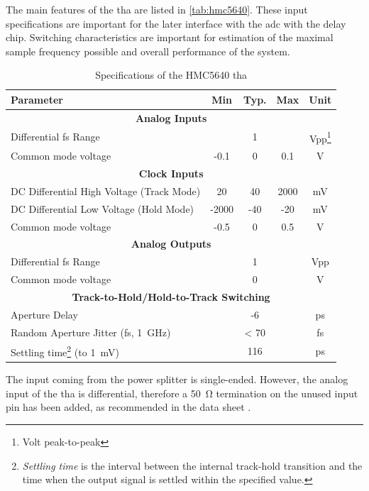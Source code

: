 The main features of the \gls{tha} are listed in \autoref{tab:hmc5640}.
These input specifications are important for the later interface with the \gls{adc} with the delay chip.
Switching characteristics are important for estimation of the maximal sample frequency possible and overall performance of the system.
\begin{table}[tbh]
	\caption[HMC5640 Characteristics]{Specifications of the HMC5640 \gls{tha}}
	\label{tab:hmc5640}
	\begin{minipage}{\textwidth}
		\centering
		\begin{tabularx}{\textwidth}{Xcccc}
			\toprule
			\textbf{Parameter} & \textbf{Min} & \textbf{Typ.} & \textbf{Max} & \textbf{Unit}\\
			\midrule
			\multicolumn{5}{c}{\textbf{Analog Inputs}}  \\
			Differential \gls{fs} Range & & 1 & & Vpp\footnote{Volt peak-to-peak}\\
			Common mode voltage & -0.1 & 0 & 0.1 & V\\[0.3cm]
		    \multicolumn{5}{c}{\textbf{Clock Inputs}}  \\
			DC Differential High Voltage (Track Mode) & 20 & 40 & 2000 & mV\\
			DC Differential Low Voltage (Hold Mode) & -2000 & -40 & -20 & mV\\
			Common mode voltage & -0.5 & 0 & 0.5 & V\\[0.3cm]
		    \multicolumn{5}{c}{\textbf{Analog Outputs}}  \\
			Differential \gls{fs} Range &  & 1 && Vpp\\
			Common mode voltage & & 0 & & V\\[0.3cm]
			\multicolumn{5}{c}{\textbf{Track-to-Hold/Hold-to-Track Switching}} \\
			Aperture Delay & & -6 &  & ps\\
			Random Aperture Jitter (\gls{fs}, \SI{1}{\giga \hertz}) & & < 70 & & fs\\
			Settling time\footnote{\textit{Settling time} is the interval between the internal track-hold transition and the time when the output signal is settled within the specified value.} (to \SI{1}{\milli \volt}) &	&  116 & & ps \\
			\bottomrule
		\end{tabularx}
	\end{minipage}
\end{table}

The input coming from the power splitter is single-ended.
However, the analog input of the \gls{tha} is differential, therefore a \SI{50}{\ohm} termination on the unused input pin has been added, as recommended in the data sheet \cite{hmc5640}.

